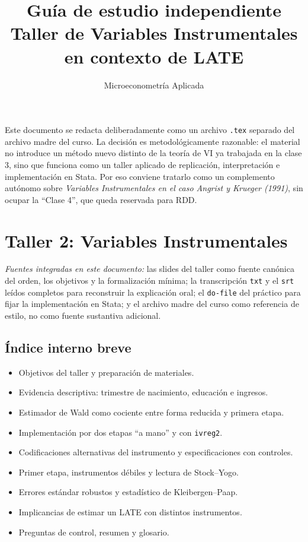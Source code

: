 \documentclass[11pt]{article}
\title{Guía de estudio independiente\\Taller de Variables Instrumentales en contexto de LATE}
\author{Microeconometría Aplicada}
\date{}
\newcommand{\q}[1]{``#1''}
\begin{document}
\maketitle
\tableofcontents

\begin{tcolorbox}[colback=gray!6,colframe=gray!50,title=Nota de alcance]
Este documento se redacta deliberadamente como un archivo \texttt{.tex} separado del archivo madre del curso. La decisión es metodológicamente razonable: el material no introduce un método nuevo distinto de la teoría de VI ya trabajada en la clase 3, sino que funciona como un taller aplicado de replicación, interpretación e implementación en Stata. Por eso conviene tratarlo como un complemento autónomo sobre \emph{Variables Instrumentales en el caso Angrist y Krueger (1991)}, sin ocupar la \q{Clase 4}, que queda reservada para RDD.
\end{tcolorbox}

\section{Taller 2: Variables Instrumentales}

\noindent\textit{Fuentes integradas en este documento:} las slides del taller como fuente canónica del orden, los objetivos y la formalización mínima; la transcripción \texttt{txt} y el \texttt{srt} leídos completos para reconstruir la explicación oral; el \texttt{do-file} del práctico para fijar la implementación en Stata; y el archivo madre del curso como referencia de estilo, no como fuente sustantiva adicional.

\subsection*{Índice interno breve}
\begin{itemize}[leftmargin=1.5em]
    \item Objetivos del taller y preparación de materiales.
    \item Evidencia descriptiva: trimestre de nacimiento, educación e ingresos.
    \item Estimador de Wald como cociente entre forma reducida y primera etapa.
    \item Implementación por dos etapas \q{a mano} y con \texttt{ivreg2}.
    \item Codificaciones alternativas del instrumento y especificaciones con controles.
    \item Primer etapa, instrumentos débiles y lectura de Stock--Yogo.
    \item Errores estándar robustos y estadístico de Kleibergen--Paap.
    \item Implicancias de estimar un LATE con distintos instrumentos.
    \item Preguntas de control, resumen y glosario.
\end{itemize}
\end{document}
